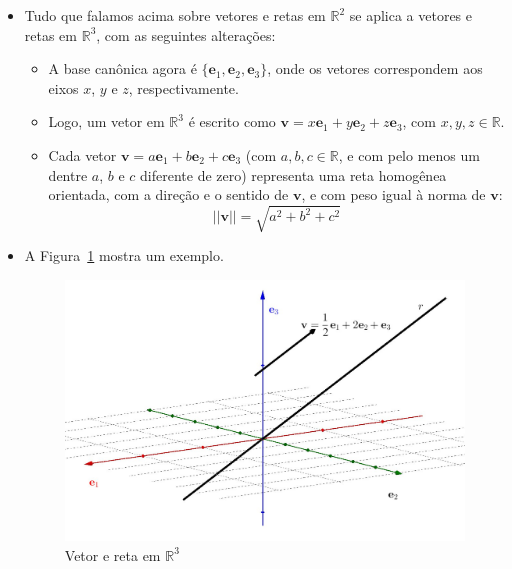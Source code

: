 \documentclass[
  letterpaper,
  DIV=11,
  numbers=noendperiod]{scrreprt}
\begin{document}
\begin{itemize}
\item
  Tudo que falamos acima sobre vetores e retas em $\mathbb{R}^2$ se
  aplica a vetores e retas em $\mathbb{R}^3$, com as seguintes
  alterações:

  \begin{itemize}
  \item
    A base canônica agora é
    $\{ \mathbf{e}_{1}, \mathbf{e}_{2}, \mathbf{e}_{3} \}$, onde os
    vetores correspondem aos eixos $x$, $y$ e $z$, respectivamente.
  \item
    Logo, um vetor em $\mathbb{R}^3$ é escrito como
    $\mathbf{v} = x\mathbf{e}_{1} + y\mathbf{e}_{2} + z\mathbf{e}_{3}$,
    com $x, y, z \in \mathbb{R}$.
  \item
    Cada vetor
    $\mathbf{v} = a\mathbf{e}_{1} + b\mathbf{e}_{2} + c\mathbf{e}_{3}$
    (com $a, b, c \in \mathbb{R}$, e com pelo menos um dentre $a$, $b$ e
    $c$ diferente de zero) representa uma reta homogênea orientada, com
    a direção e o sentido de $\mathbf{v}$, e com peso igual à norma de
    $\mathbf{v}$: \[
    ||\mathbf{v}|| = \sqrt{a^2 + b^2 + c^2}
    \]
  \end{itemize}
\item
  A Figura~\ref{fig-reta-r3} mostra um exemplo.

  \begin{figure}[t]

  {\centering \includegraphics[width=1\textwidth,height=\textheight]{figures/reta-r3.png}

  }

  \caption{\label{fig-reta-r3}Vetor e reta em $\mathbb{R}^3$}

  \end{figure}
\end{itemize}
\end{document}

